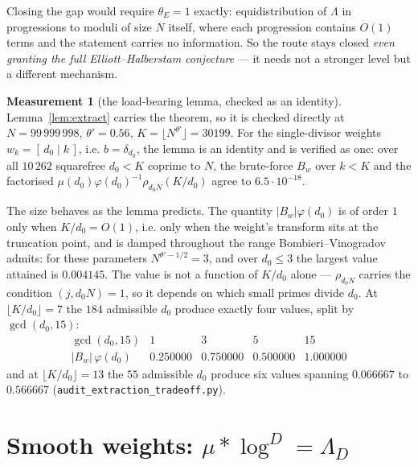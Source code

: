 \documentclass[11pt,a4paper]{article}
\theoremstyle{plain}
\theoremstyle{definition}
\newtheorem{measurement}[theorem]{Measurement}
\theoremstyle{remark}
\begin{document}
Closing the gap would require $\theta_E=1$ exactly: equidistribution
of $\Lambda$ in progressions to moduli of size $N$ itself, where each
progression contains $O(1)$ terms and the statement carries no
information. So the route stays closed \emph{even granting the full
Elliott--Halberstam conjecture} --- it needs not a stronger level but
a different mechanism.

\begin{measurement}[the load-bearing lemma, checked as an identity]%
\label{meas:extract}
Lemma~\ref{lem:extract} carries the theorem, so it is checked
directly at $N=99\,999\,998$, $\theta'=0.56$,
$K=\lfloor N^{\theta'}\rfloor=30199$. For the single-divisor weights
$w_k=[\,d_0\mid k\,]$, i.e. $b=\delta_{d_0}$, the lemma is an identity
and is verified as one: over all $10\,262$ squarefree $d_0<K$ coprime
to $N$, the brute-force $B_w$ over $k<K$ and the factorised
$\mu(d_0)\varphi(d_0)^{-1}\rho_{d_0N}(K/d_0)$ agree to
$6.5\cdot10^{-18}$.

The size behaves as the lemma predicts. The quantity
$|B_w|\varphi(d_0)$ is of order $1$ only when $K/d_0=O(1)$, i.e. only
when the weight's transform sits at the truncation point, and is
damped throughout the range Bombieri--Vinogradov admits: for these
parameters $N^{\theta'-1/2}=3$, and over $d_0\le3$ the largest value
attained is $0.004145$. The value is not a function of $K/d_0$ alone
--- $\rho_{d_0N}$ carries the condition $(j,d_0N)=1$, so it depends on
which small primes divide $d_0$. At $\lfloor K/d_0\rfloor=7$ the $184$
admissible $d_0$ produce exactly four values, split by $\gcd(d_0,15)$:
\[
\begin{array}{r|cccc}
 \gcd(d_0,15) & 1 & 3 & 5 & 15\\\hline
 |B_w|\,\varphi(d_0) & 0.250000 & 0.750000 & 0.500000 & 1.000000
\end{array}
\]
and at $\lfloor K/d_0\rfloor=13$ the $55$ admissible $d_0$ produce six
values spanning $0.066667$ to $0.566667$
(\texttt{audit\_extraction\_tradeoff.py}).
\end{measurement}

\section{Smooth weights:
\texorpdfstring{$\mu*\log^D=\Lambda_D$}{mu * log\^{}D = Lambda\_D}}%
\label{sec:Dpp}
\end{document}
